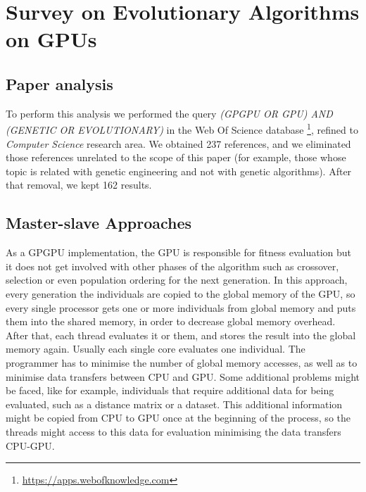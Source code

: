 \documentclass[Afour,sageh,times]{sagej}
\begin{document}
\section{Survey on Evolutionary Algorithms on GPUs} %
\label{sec:survey}

\subsection{Paper analysis} %

To perform this analysis we performed the query \textit{(GPGPU OR GPU) AND (GENETIC OR EVOLUTIONARY)} in the Web Of Science database \footnote{\url{https://apps.webofknowledge.com}}, refined to {\em Computer Science} research area. We obtained 237 references, and we eliminated those references unrelated to the scope of this paper (for example, those whose topic is related with genetic engineering and not with genetic algorithms). After that removal, we kept 162 results.




\subsection{Master-slave Approaches}
\label{sec:masterSlave}



As a GPGPU implementation, the GPU is responsible for fitness evaluation but it does not get involved with other phases of the algorithm such as crossover, selection or even population ordering for the next generation. In this approach, every generation the individuals are copied to the global memory of the GPU, so every single processor gets one or more individuals from global memory and puts them into the shared memory, in order to decrease global memory overhead. After that, each thread evaluates it or them, and stores the result into the global memory again. Usually each single core evaluates one individual. The programmer has to minimise the number of global memory accesses, as well as to minimise data transfers between CPU and GPU. Some additional problems might be faced, like for example, individuals that require additional data for being evaluated, such as a distance matrix or a dataset. This additional information might be copied from CPU to GPU once at the beginning of the process, so the threads might access to this data for evaluation minimising the data transfers CPU-GPU. 
\end{document}
